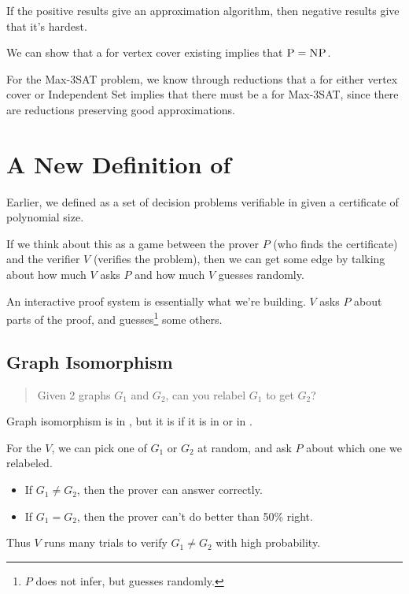             If the positive results give an approximation algorithm, then negative results give that it's hardest.

            We can show that a \ptas for vertex cover existing implies that $\textsc{P} = \textsc{NP}$.

            For the Max-3SAT problem, we know through reductions that a \ptas for either vertex cover or Independent Set implies that there must be a \ptas for Max-3SAT, since there are reductions preserving good approximations.

            \section{A New Definition of \np} %
            \label{sec:a_new_definition_of_np}
                Earlier, we defined \np as a set of decision problems verifiable in \p given a certificate of polynomial size.

                If we think about this as a game between the prover $P$ (who finds the certificate) and the verifier $V$ (verifies the problem), then we can get some edge by talking about how much $V$ asks $P$ and how much $V$ guesses randomly.

                An interactive proof system is essentially what we're building. $V$ asks $P$ about parts of the proof, and guesses\footnote{$P$ does not infer, but guesses randomly.} some others.
                \subsection{Graph Isomorphism} %
                \label{sub:graph_isomorphism}
                    \begin{quotation}
                        Given 2 graphs $G_1$ and $G_2$, can you relabel $G_1$ to get $G_2$?
                    \end{quotation}
                    Graph isomorphism is in \np, but it is \open if it is in \p or in \npcomplete.

                    For the $V$, we can pick one of $G_1$ or $G_2$ at random, and ask $P$ about which one we relabeled.

                    \begin{itemize}
                        \item If $G_1 \not= G_2$, then the prover can answer correctly.
                        \item If $G_1 = G_2$, then the prover can't do better than 50\% right.
                    \end{itemize}
                    Thus $V$ runs many trials to verify $G_1 \not= G_2$ with high probability.

